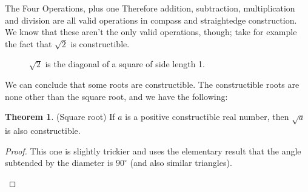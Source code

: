 \documentclass[12pt]{article}
\theoremstyle{definition}
\theoremstyle{definition}
\theoremstyle{definition}
\newtheorem{theorem}{Theorem}[section]
\theoremstyle{definition}
\theoremstyle{definition}
\theoremstyle{definition}
\theoremstyle{definition}
\begin{document}
\begin{section}{The Four Operations, plus one}
    Therefore addition, subtraction, multiplication and division are all valid operations in compass and straightedge construction. We 
    know that these aren't the only valid operations, though; take for example the fact that \(\sqrt{2}\) is constructible.\\
    \begin{figure}[H]
        \centering
        \caption*{\(\sqrt{2}\) is the diagonal of a square of side length 1.}
    \end{figure}

    We can conclude that some roots are constructible. The constructible roots are none other than the square root, and we have the following:
    \begin{theorem}{(Square root)}
        If \(a\) is a positive constructible real number, then \(\sqrt{a}\) is also constructible.
        \begin{proof}
            This one is slightly trickier and uses the elementary result that the angle subtended by the diameter is \(90^{\circ}\) (and also 
            similar triangles).
            \begin{figure}[h!]
                \centering
\end{figure}
\end{proof}
\end{theorem}
\end{section}
\end{document}

